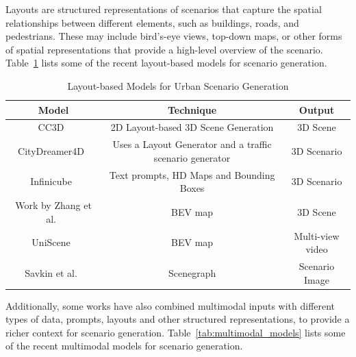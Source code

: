 \documentclass{article}
\begin{document}
Layouts are structured representations of scenarios that capture the spatial relationships between different elements, such as buildings, roads, and pedestrians. These may include bird's-eye views, top-down maps, or other forms of spatial representations that provide a high-level overview of the scenario. Table~\ref{tab:layout_based_models} lists some of the recent layout-based models for scenario generation.

\begin{table}[ht]
\centering
    \begin{tabular}{|c|c|c|}
    \hline
    \textbf{Model} & \textbf{Technique} & \textbf{Output} \\ \hline
    CC3D~\cite{bahmani2023cc3d} & 2D Layout-based 3D Scene Generation & 3D Scene \\ \hline
    CityDreamer4D~\cite{xie2025citydreamer4d} & Uses a Layout Generator and a traffic scenario generator & 3D Scenario \\ \hline
    Infinicube~\cite{lu2024infinicube} & Text prompts, HD Maps and Bounding Boxes & 3D Scenario \\ \hline
    Work by Zhang et al.~\cite{urbandiff} & BEV map & 3D Scene \\ \hline
    UniScene~\cite{li2025uniscene} & BEV map & Multi-view video \\ \hline
    Savkin et al.~\cite{savkin2021unsupervised} & Scenegraph & Scenario Image \\ \hline
    \end{tabular}
\caption{Layout-based Models for Urban Scenario Generation}
\label{tab:layout_based_models}
\end{table}

Additionally, some works have also combined multimodal inputs with different types of data, prompts, layouts and other structured representations, to provide a richer context for scenario generation. Table~\ref{tab:multimodal_models} lists some of the recent multimodal models for scenario generation.
\end{document}
